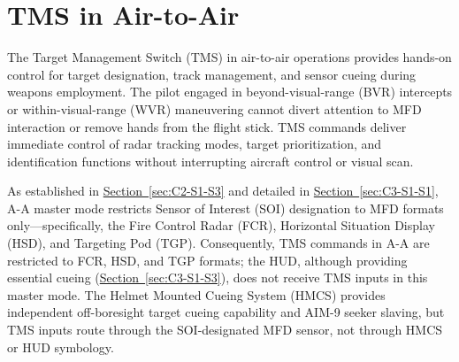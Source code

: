 \documentclass[11pt, a4paper, twoside]{report}
\newcommand{\secref}[1]{\hyperref[#1]{Section~\ref*{#1}}}
\begin{document}

\section{TMS in Air-to-Air}
\label{sec:C4-S3}

The Target Management Switch (TMS) in air-to-air operations provides hands-on control for target designation, track management, and sensor cueing during weapons employment. The pilot engaged in beyond-visual-range (BVR) intercepts or within-visual-range (WVR) maneuvering cannot divert attention to MFD interaction or remove hands from the flight stick. TMS commands deliver immediate control of radar tracking modes, target prioritization, and identification functions without interrupting aircraft control or visual scan.

As established in \secref{sec:C2-S1-S3} and detailed in \secref{sec:C3-S1-S1}, A-A master mode restricts Sensor of Interest (SOI) designation to MFD formats only—specifically, the Fire Control Radar (FCR), Horizontal Situation Display (HSD), and Targeting Pod (TGP). Consequently, TMS commands in A-A are restricted to FCR, HSD, and TGP formats; the HUD, although providing essential cueing (\secref{sec:C3-S1-S3}), does not receive TMS inputs in this master mode. The Helmet Mounted Cueing System (HMCS) provides independent off-boresight target cueing capability and AIM-9 seeker slaving, but TMS inputs route through the SOI-designated MFD sensor, not through HMCS or HUD symbology.
\end{document}
